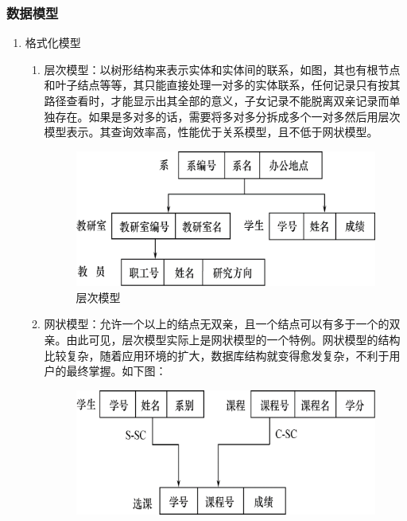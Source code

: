 \documentclass[chapter.computer_science.tex]{subfiles}
\begin{document}
\subsubsection{数据模型}
\begin{enumerate}
    \item 格式化模型
        \begin{enumerate}
            \item 层次模型：以树形结构来表示实体和实体间的联系，如图，其也有根节点和叶子结点等等，其只能直接处理一对多的实体联系，任何记录只有按其路径查看时，才能显示出其全部的意义，子女记录不能脱离双亲记录而单独存在。如果是多对多的话，需要将多对多分拆成多个一对多然后用层次模型表示。其查询效率高，性能优于关系模型，且不低于网状模型。
                \begin{figure}[H]
                    \centering
                    \includegraphics[scale=0.5]{./images/0020.png}
                    \caption{层次模型}
                \end{figure}
            \item 网状模型：允许一个以上的结点无双亲，且一个结点可以有多于一个的双亲。由此可见，层次模型实际上是网状模型的一个特例。网状模型的结构比较复杂，随着应用环境的扩大，数据库结构就变得愈发复杂，不利于用户的最终掌握。如下图：
                \begin{figure}[H]
                    \centering
                    \includegraphics[scale=0.5]{./images/0021.png}

\end{figure}
\end{enumerate}
\end{enumerate}
\end{document}
